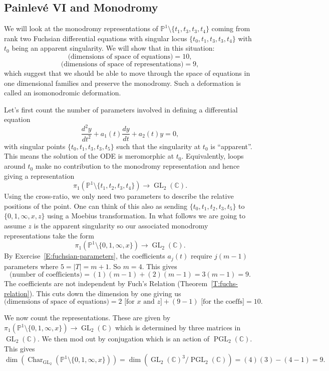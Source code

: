 \documentclass[12pt]{book}
\numberwithin{equation}{section}
\theoremstyle{definition}
\theoremstyle{remark}
\newcommand{\CC}{\mathbb{C}}
\newcommand{\PP}{\mathbb{P}}
\newcommand{\GL}{\operatorname{GL}}
\newcommand{\Char}{\operatorname{Char}}
\newcommand{\PGL}{\operatorname{PGL}}
\begin{document}
\subsection{Painlev\'e VI and Monodromy}
We will look at the monodromy representations of $\PP^1\setminus \lbrace t_1,t_3,t_3,t_4\rbrace$ coming from rank two Fuchsian differential equations with singular locus $\lbrace t_0,t_1,t_3,t_3,t_4\rbrace$ with $t_0$ being an apparent singularity. 
We will show that in this situation:
 $$ \mbox{(dimensions of space of equations)} = 10, $$
  $$ \mbox{(dimensions of space of representations)} = 9, $$
which suggest that we should be able to move through the space of equations in one dimensional families and preserve the monodromy.
Such a deformation is called an isomonodromic deformation.

Let's first count the number of parameters involved in defining a differential equation
 $$ \dfrac{d^2y}{dt^2} + a_1(t) \dfrac{dy}{dt} + a_2(t)y=0,$$ 
with singular points $\lbrace t_0,t_1,t_3,t_3,t_5\rbrace$ such that the singularity at $t_0$ is ``apparent''. 
This means the solution of the ODE is meromorphic at $t_0$. 
Equivalently, loops around $t_0$ make no contribution to the monodromy representation and hence giving a representation 
 $$ \pi_1(\PP^1\setminus \lbrace t_1,t_2,t_3,t_4\rbrace) \to \GL_2(\CC).$$ 
Using the cross-ratio, we only need two parameters to describe the relative positions of the point. 
One can think of this also as sending $\lbrace t_0,t_1,t_2,t_3,t_5\rbrace$ to $\lbrace 0,1,\infty,x,z\rbrace$ using a Moebius transformation. 
In what follows we are going to assume $z$ is the apparent singularity so our associated monodromy representations take the form
 $$ \pi_1(\PP^1\setminus \lbrace 0,1,\infty,x\rbrace) \to \GL_2(\CC).$$
By Exercise~\ref{E:fuchsian-parameters}, the coefficients $a_j(t)$ require $j(m-1)$ parameters where $5=\vert T \vert =m+1$.
So $m=4$.
This gives 
 $$ \mbox{(number of coefficients)} = (1)(m-1) + (2)(m-1) = 3(m-1) = 9.$$
The coefficients are not independent by Fuch's Relation (Theorem~\ref{T:fuchs-relation}).
This cuts down the dimension by one giving us 
$$\mbox{(dimensions of space of equations)} = 2 \mbox{ [for $x$ and $z$]}+(9-1) \mbox{ [for the coeffs]} = 10. $$

We now count the representations.
These are given by $\pi_1(\PP^1\setminus \lbrace 0,1,\infty,x \rbrace) \to \GL_2(\CC)$ which is determined by three matrices in $\GL_2(\CC)$. 
We then mod out by conjugation which is an action of $\PGL_2(\CC)$. 
This gives 
$$ \dim(\Char_{\GL_2}(\PP^1\setminus \lbrace 0,1,\infty,x\rbrace)) = \dim( \GL_2(\CC)^3/\PGL_2(\CC) ) = (4)(3) - (4-1) = 9.$$
\end{document}
